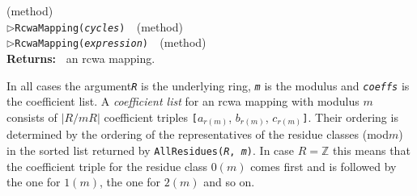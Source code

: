 \documentclass[a4paper,11pt]{report}
\begin{document}
{{{{{\label{RcwaMapping:by two partitions of a ring into residue classes}
}\hfill{\scriptsize (method)}}\\
\noindent\textcolor{FuncColor}{$\triangleright$\enspace\texttt{RcwaMapping({\mdseries\slshape cycles})
\label{RcwaMapping:by residue class cycles}
}\hfill{\scriptsize (method)}}\\
\noindent\textcolor{FuncColor}{$\triangleright$\enspace\texttt{RcwaMapping({\mdseries\slshape expression})
\label{RcwaMapping:by arithmetical expression}
}\hfill{\scriptsize (method)}}\\
\textbf{\indent Returns:\ }
 an rcwa mapping. 



 In all cases the argument{\nobreakspace}\mbox{\texttt{\mdseries\slshape R}} is the underlying ring, \mbox{\texttt{\mdseries\slshape m}} is the modulus and \mbox{\texttt{\mdseries\slshape coeffs}} is the coefficient list. A \emph{coefficient list} for an rcwa mapping with modulus $m$ consists of $|R/mR|$ coefficient triples \texttt{[}$a_{r(m)}$, $b_{r(m)}$, $c_{r(m)}$\texttt{]}. Their ordering is determined by the ordering of the representatives of the
residue classes (mod{\nobreakspace}$m$) in the sorted list returned by \texttt{AllResidues(\mbox{\texttt{\mdseries\slshape R}}, \mbox{\texttt{\mdseries\slshape m}})}. In case $R = {\ensuremath{\mathbb Z}}$ this means that the coefficient triple for the residue class $0(m)$ comes first and is followed by the one for $1(m)$, the one for $2(m)$ and so on. 

}}}
\end{document}
